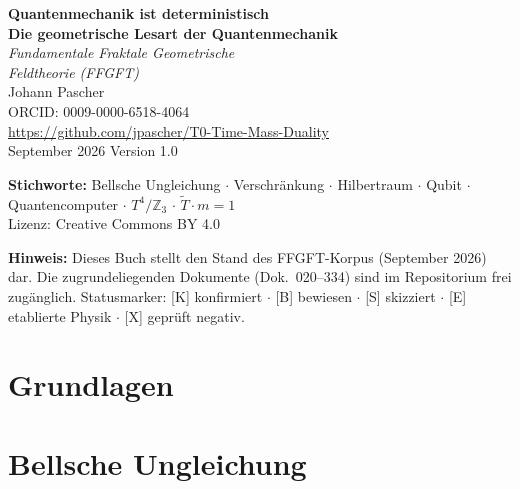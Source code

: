 \documentclass[11pt,oneside]{book}
\begin{document}
\frontmatter
\pagestyle{fancy}
\makeatletter\let\ps@plain\ps@fancy\makeatother
\begin{titlepage}
  \centering\vspace*{1.5cm}
  {\Huge\bfseries\color{blue!70!black}Quantenmechanik ist deterministisch}\\[0.6cm]
  {\Large\bfseries\color{blue!40!black}Die geometrische Lesart der Quantenmechanik}\\[1cm]
  {\LARGE\itshape Fundamentale Fraktale Geometrische\\[0.2cm]Feldtheorie (FFGFT)}\\[2cm]
  {\large Johann Pascher}\\[0.3cm]
  {\normalsize ORCID: 0009-0000-6518-4064}\\[0.3cm]
  {\normalsize\url{https://github.com/jpascher/T0-Time-Mass-Duality}}\\[1.5cm]
  {\normalsize September 2026}\vfill
  {\small Version 1.0}
\end{titlepage}
\newpage\thispagestyle{empty}%
{\small\noindent\textbf{Stichworte:} Bellsche Ungleichung $\cdot$ Verschränkung $\cdot$ Hilbertraum $\cdot$ Qubit $\cdot$ Quantencomputer $\cdot$ $T^4/\mathbb{Z}_3$ $\cdot$ $\tilde T\cdot m=1$\\[0.8em]
\noindent Lizenz: Creative Commons BY 4.0}\par\vspace{1em}
{\small\noindent\textbf{Hinweis:} Dieses Buch stellt den Stand des FFGFT-Korpus (September 2026) dar. Die zugrundeliegenden Dokumente (Dok.~020--334) sind im Repositorium frei zugänglich. Statusmarker: [K] konfirmiert $\cdot$ [B] bewiesen $\cdot$ [S] skizziert $\cdot$ [E] etablierte Physik $\cdot$ [X] geprüft negativ.}
\tableofcontents
\mainmatter

\part{Grundlagen}




\part{Bellsche Ungleichung}





\end{document}
